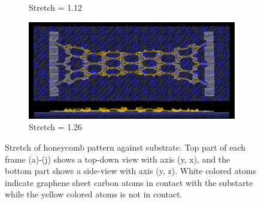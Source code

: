 \begin{figure}[H]
\begin{subfigure}[b]{0.49\textwidth}
        \caption{Stretch = 1.12}
        \label{fig:}
    \end{subfigure}
    \begin{subfigure}[b]{0.49\textwidth}
        \centering
        \includegraphics[width=\textwidth]{figures/baseline/contact_vs_stretch/honeycomb/hon_stretch0126.png}
        \caption{Stretch = 1.26}
        \label{fig:}
    \end{subfigure}
    \hfill
       \caption{Stretch of honeycomb pattern against substrate. Top part of each frame (a)-(j) shows a top-down view with axis (y, x), and the bottom part shows a side-view with axis (y, z). White colored atoms indicate graphene sheet carbon atoms in contact with the substarte while the yellow colored atoms is not in contact.}
       \label{fig:}
  \end{figure}
  



  

